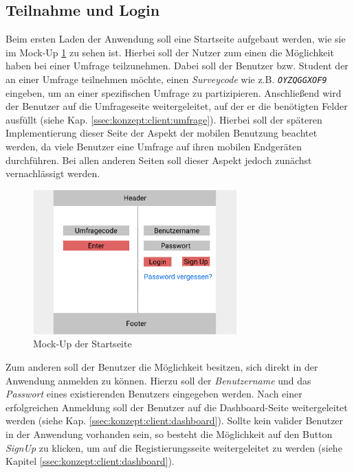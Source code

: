 \subsection{Teilnahme und Login}

Beim ersten Laden der Anwendung soll eine Startseite aufgebaut werden, wie sie im Mock-Up \ref{fig:MockSignin} zu sehen ist. 
Hierbei soll der Nutzer zum einen die Möglichkeit haben bei einer Umfrage teilzunehmen. 
Dabei soll der Benutzer bzw. Student der an einer Umfrage teilnehmen möchte, einen \emph{Surveycode} wie z.B. \emph{\texttt{OYZQGGXOF9}} eingeben, um an einer spezifischen Umfrage zu partizipieren. 
Anschließend wird der Benutzer auf die Umfrageseite weitergeleitet, auf der er die benötigten Felder ausfüllt (siehe Kap. \ref{ssec:konzept:client:umfrage}).
Hierbei soll der späteren Implementierung dieser Seite der Aspekt der mobilen Benutzung beachtet werden, da viele Benutzer eine Umfrage auf ihren mobilen Endgeräten durchführen. 
Bei allen anderen Seiten soll dieser Aspekt jedoch zunächst vernachlässigt werden.

\begin{figure}[H]
	\centering
	\includegraphics[width=0.7\textwidth]{img/konzeption/client/signin}
	\captionsetup{justification=centering, format=plain}
	\caption[Mock-Up der Startseite]{Mock-Up der Startseite \\\figma}
	\label{fig:MockSignin}
\end{figure}

Zum anderen soll der Benutzer die Möglichkeit besitzen, sich direkt in der Anwendung anmelden zu können.
Hierzu soll der \emph{Benutzername} und das \emph{Passwort} eines existierenden Benutzers eingegeben werden. 
Nach einer erfolgreichen Anmeldung soll der Benutzer auf die Dashboard-Seite weitergeleitet werden (siehe Kap. \ref{ssec:konzept:client:dashboard}).
Sollte kein valider Benutzer in der Anwendung vorhanden sein, so besteht die Möglichkeit auf den Button \emph{SignUp} zu klicken, um auf die Registierungsseite weitergeleitet zu werden (siehe Kapitel \ref{ssec:konzept:client:dashboard}).

